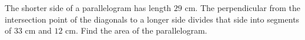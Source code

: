 The shorter side of a parallelogram has length $29$ cm. The perpendicular from the intersection point of the diagonals to a longer side divides that side into segments of $33$ cm and $12$ cm. Find the area of the parallelogram.
